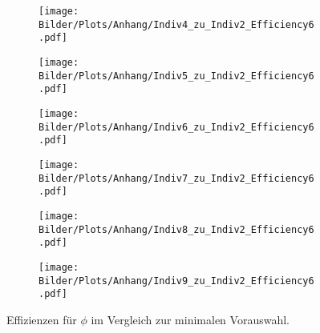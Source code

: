 \begin{figure}
  \begin{subfigure}[t]{0.5\textwidth}
  \texttt{[image: Bilder/Plots/Anhang/Indiv4\_zu\_Indiv2\_Efficiency6.pdf]}
  \end{subfigure}
\begin{subfigure}[t]{0.5\textwidth}
 \texttt{[image: Bilder/Plots/Anhang/Indiv5\_zu\_Indiv2\_Efficiency6.pdf]}
\end{subfigure}
\begin{subfigure}[t]{0.5\textwidth}
  \texttt{[image: Bilder/Plots/Anhang/Indiv6\_zu\_Indiv2\_Efficiency6.pdf]}
\end{subfigure}
\begin{subfigure}[t]{0.5\textwidth}
  \texttt{[image: Bilder/Plots/Anhang/Indiv7\_zu\_Indiv2\_Efficiency6.pdf]}
\end{subfigure}
\begin{subfigure}[t]{0.5\textwidth}
  \texttt{[image: Bilder/Plots/Anhang/Indiv8\_zu\_Indiv2\_Efficiency6.pdf]}
\end{subfigure}
\begin{subfigure}[t]{0.5\textwidth}
  \texttt{[image: Bilder/Plots/Anhang/Indiv9\_zu\_Indiv2\_Efficiency6.pdf]}
\end{subfigure}
\caption{Effizienzen für $\phi$ im Vergleich zur minimalen Vorauswahl.}
\end{figure}
\clearpage
